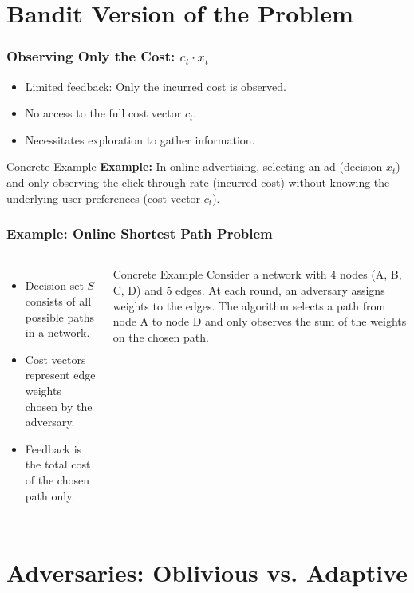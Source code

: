 \documentclass{beamer}
\begin{document}
\section{Bandit Version of the Problem}

\begin{frame}
\frametitle{Observing Only the Cost: \( c_t \cdot x_t \)}
\begin{itemize}
    \item Limited feedback: Only the incurred cost is observed.
    \item No access to the full cost vector \( c_t \).
    \item Necessitates exploration to gather information.
\end{itemize}
\begin{exampleblock}{Concrete Example}
    \textbf{Example:} In online advertising, selecting an ad (decision \( x_t \)) and only observing the click-through rate (incurred cost) without knowing the underlying user preferences (cost vector \( c_t \)).
\end{exampleblock}
\end{frame}

\begin{frame}
\frametitle{Example: Online Shortest Path Problem}
\begin{columns}
    \begin{itemize}
        \item Decision set \( S \) consists of all possible paths in a network.
        \item Cost vectors represent edge weights chosen by the adversary.
        \item Feedback is the total cost of the chosen path only.
    \end{itemize}
    \begin{exampleblock}{Concrete Example}
        Consider a network with 4 nodes (A, B, C, D) and 5 edges. At each round, an adversary assigns weights to the edges. The algorithm selects a path from node A to node D and only observes the sum of the weights on the chosen path.
    \end{exampleblock}
\end{columns}
\end{frame}

\section{Adversaries: Oblivious vs. Adaptive}
\end{document}

